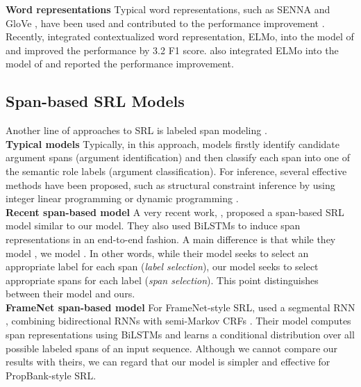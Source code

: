 \documentclass[11pt,a4paper]{article}
\begin{document}
\noindent
{\bf Word representations} \hspace{0.2cm} Typical word representations, such as SENNA \cite{collobert:11} and GloVe \cite{pennington:14}, have been used and contributed to the performance improvement \cite{collobert:11,zhou:15,he:17}.
Recently,  integrated contextualized word representation, ELMo, into the model of  and improved the performance by 3.2 F1 score.
 also integrated ELMo into the model of  and reported the performance improvement.

\subsection{Span-based SRL Models}
Another line of approaches to SRL is labeled span modeling \cite{xue:04,koomen:05,toutanova:05}.\\

\vspace{-0.3cm}
\noindent
{\bf Typical models} \hspace{0.2cm} 
Typically, in this approach, models firstly identify candidate argument spans (argument identification) and then classify each span into one of the semantic role labels (argument classification).
For inference, several effective methods have been proposed, such as structural constraint inference by using integer linear programming \cite{punyakanok:08} or dynamic programming \cite{oscar:15,fitzgerald:15}.\\

\vspace{-0.3cm}
\noindent
{\bf Recent span-based model} \hspace{0.2cm} A very recent work, , proposed a span-based SRL model similar to our model.
They also used BiLSTMs to induce span representations in an end-to-end fashion.
A main difference is that while they model , we model .
In other words, while their model seeks to select an appropriate label for each span ({\it label selection}), our model seeks to select appropriate spans for each label ({\it span selection}).
This point distinguishes between their model and ours.\\

\vspace{-0.3cm}
\noindent
{\bf FrameNet span-based model} \hspace{0.2cm} For FrameNet-style SRL,  used a segmental RNN \cite{kong:16}, combining bidirectional RNNs with semi-Markov CRFs \cite{sarawagi:04}.
Their model computes span representations using BiLSTMs and learns a conditional distribution over all possible labeled spans of an input sequence.
Although we cannot compare our results with theirs, we can regard that our model is simpler and effective for PropBank-style SRL.
\end{document}

